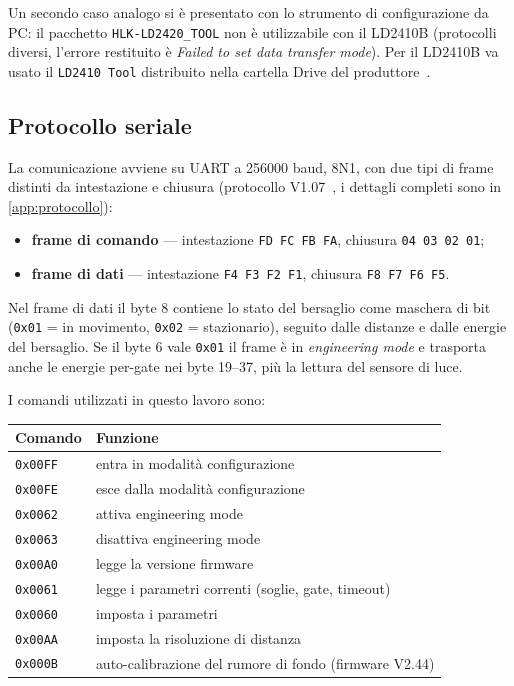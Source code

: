 Un secondo caso analogo si è presentato con lo strumento di configurazione da PC:
il pacchetto \texttt{HLK-LD2420\_TOOL} non è utilizzabile con il LD2410B (protocolli
diversi, l'errore restituito è \emph{Failed to set data transfer mode}). Per il
LD2410B va usato il \texttt{LD2410 Tool} distribuito nella cartella Drive del
produttore~\cite{hilinkDriveLD2410B}.

\subsection{Protocollo seriale}
\label{sec:protocollo-seriale}

La comunicazione avviene su UART a 256000 baud, 8N1, con due tipi di frame
distinti da intestazione e chiusura (protocollo V1.07~\cite{hilinkProtoV107}, i
dettagli completi sono in \cref{app:protocollo}):

\begin{itemize}[leftmargin=1.4em,itemsep=2pt]
  \item \textbf{frame di comando} --- intestazione \texttt{FD FC FB FA}, chiusura
        \texttt{04 03 02 01};
  \item \textbf{frame di dati} --- intestazione \texttt{F4 F3 F2 F1}, chiusura
        \texttt{F8 F7 F6 F5}.
\end{itemize}

Nel frame di dati il byte 8 contiene lo stato del bersaglio come maschera di bit
(\texttt{0x01} = in movimento, \texttt{0x02} = stazionario), seguito dalle distanze
e dalle energie del bersaglio. Se il byte 6 vale \texttt{0x01} il frame è in
\emph{engineering mode} e trasporta anche le energie per-gate nei byte 19--37, più
la lettura del sensore di luce.

I comandi utilizzati in questo lavoro sono:

\begin{center}\small
\begin{tabular}{@{}ll@{}}
\toprule
\textbf{Comando} & \textbf{Funzione} \\
\midrule
\texttt{0x00FF} & entra in modalità configurazione \\
\texttt{0x00FE} & esce dalla modalità configurazione \\
\texttt{0x0062} & attiva engineering mode \\
\texttt{0x0063} & disattiva engineering mode \\
\texttt{0x00A0} & legge la versione firmware \\
\texttt{0x0061} & legge i parametri correnti (soglie, gate, timeout) \\
\texttt{0x0060} & imposta i parametri \\
\texttt{0x00AA} & imposta la risoluzione di distanza \\
\texttt{0x000B} & auto-calibrazione del rumore di fondo (firmware V2.44) \\
\bottomrule
\end{tabular}
\end{center}

